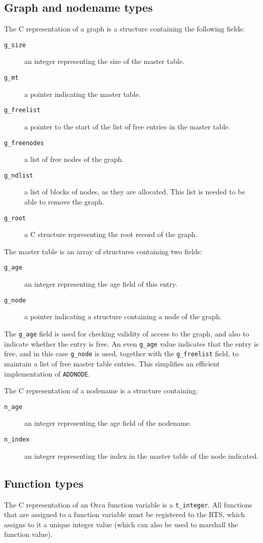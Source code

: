 \documentclass[10pt]{article}
\begin{document}
\subsection{Graph and nodename types}\label{sec:graphtype}
The C representation of a graph is a structure containing
the following fields:
\begin{description}
\item[{\tt g\_size}]
an integer representing the size of the master table.
\item[{\tt g\_mt}]
a pointer indicating the master table.
\item[{\tt g\_freelist}]
a pointer to the start of the list of free entries
in the master table.
\item[{\tt g\_freenodes}]
a list of free nodes of the graph.
\item[{\tt g\_ndlist}]
a list of blocks of nodes, as they are allocated.
This list is needed to be able to remove the graph.
\item[{\tt g\_root}]
a C structure representing the root record of the graph.
\end{description}
The master table is an array of structures containing two fields:
\begin{description}
\item[{\tt g\_age}]
an integer representing the age field of this entry.
\item[{\tt g\_node}]
a pointer indicating a structure containing a node of the graph.
\end{description}
The \verb+g_age+
field is used for checking validity of access to the
graph, and also to indicate whether the entry is free.
An even \verb+g_age+
value indicates that the entry is free, and in this case
\verb+g_node+
is used, together with the \verb+g_freelist+
field, to maintain
a list of free master table entries.
This simplifies an efficient implementation of \verb+ADDNODE+.

The C representation of a nodename is a structure containing:
\begin{description}
\item[{\tt n\_age}]
an integer representing the age field of the nodename.
\item[{\tt n\_index}]
an integer representing the index in the master table of the node indicated.
\end{description}

\subsection{Function types}
The C representation of an Orca function variable is a \verb+t_integer+.
All functions that are assigned to a function variable must be
registered to the RTS, which assigns to it a unique integer
value (which can also be used to marshall the function value).
\end{document}
